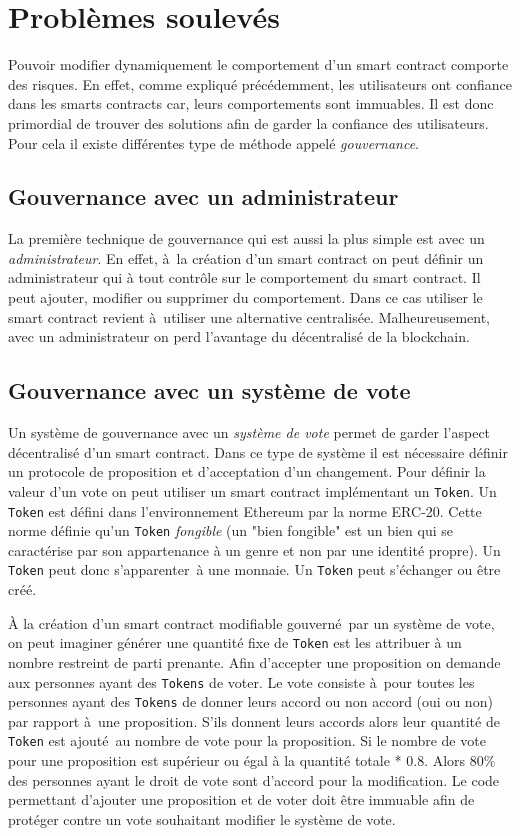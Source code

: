 \section{Problèmes soulevés}

Pouvoir modifier dynamiquement le comportement d'un smart contract comporte des risques.
En effet, comme expliqué précédemment, les utilisateurs ont confiance dans les smarts contracts
car, leurs comportements sont immuables. Il est donc primordial de trouver des solutions afin de garder
la confiance des utilisateurs. Pour cela il existe différentes type de méthode appelé \emph{gouvernance}.

\subsection{Gouvernance avec un administrateur}

La première technique de gouvernance qui est aussi la plus simple est avec un \emph{administrateur}.
En effet, à la création d'un smart contract on peut définir un administrateur qui à tout contrôle
sur le comportement du smart contract. Il peut ajouter, modifier ou supprimer du comportement.
Dans ce cas utiliser le smart contract revient à utiliser une alternative centralisée. Malheureusement, avec un 
administrateur on perd l'avantage du décentralisé de la blockchain.

\subsection{Gouvernance avec un système de vote}

Un système de gouvernance avec un \emph{système de vote} permet de garder l'aspect décentralisé d'un smart contract.
Dans ce type de système il est nécessaire définir un protocole de proposition et d'acceptation
d'un changement. Pour définir la valeur d'un vote on peut utiliser un smart contract implémentant un \texttt{Token}.
Un \texttt{Token} est défini dans l'environnement Ethereum par la norme ERC-20. Cette norme définie qu'un \texttt{Token}
\emph{fongible} (un "bien fongible" est un bien qui se caractérise par son appartenance à un genre et non par 
une identité propre). Un \texttt{Token} peut donc s'apparenter à une monnaie. Un \texttt{Token} peut s'échanger ou être créé.

À la création d'un smart contract modifiable gouverné par un système de vote, on peut imaginer générer une quantité
fixe de \texttt{Token} est les attribuer à un nombre restreint de parti prenante. Afin d'accepter une proposition on demande
aux personnes ayant des \texttt{Tokens} de voter. Le vote consiste à pour toutes les personnes ayant des \texttt{Tokens} de donner leurs accord ou non accord (oui ou non) par rapport à une proposition. S'ils donnent leurs accords alors leur quantité 
de \texttt{Token} est ajouté au nombre de vote pour la proposition. Si le nombre de vote pour une proposition est supérieur ou
égal à la quantité totale * 0.8. Alors 80\% des personnes ayant le droit de vote sont d'accord pour la modification.
Le code permettant d'ajouter une proposition et de voter doit être immuable afin de protéger contre un vote
souhaitant modifier le système de vote.

